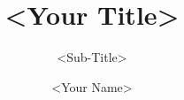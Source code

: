 \documentclass[a4paper,11pt]{article}
\begin{document}
\title{<Your Title>}
\subtitle{<Sub-Title>}
\author{<Your Name>}




\pt 





%
%
\end{document}
